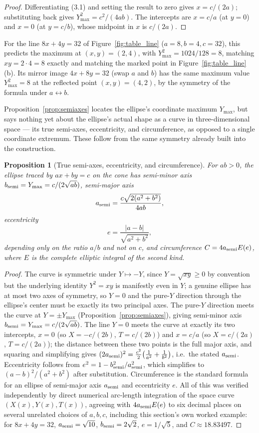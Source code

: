 \documentclass[11pt]{amsart}
\newtheorem{proposition}[theorem]{Proposition}
\theoremstyle{remark}
\begin{document}
\begin{proof}
Differentiating (3.1) and setting the result to zero gives $x=c/(2a)$; substituting back gives $Y^2_{\max}=c^2/(4ab)$. The intercepts are $x=c/a$ (at $y=0$) and $x=0$ (at $y=c/b$), whose midpoint in $x$ is $c/(2a)$.
\end{proof}

For the line $8x+4y=32$ of Figure~\ref{fig:table_line} ($a=8,b=4,c=32$), this predicts the maximum at $(x,y)=(2,4)$, with $Y^2_{\max}=1024/128=8$, matching $xy=2\cdot4=8$ exactly and matching the marked point in Figure~\ref{fig:table_line}(b). Its mirror image $4x+8y=32$ (swap $a$ and $b$) has the same maximum value $Y^2_{\max}=8$ at the reflected point $(x,y)=(4,2)$, by the symmetry of the formula under $a\leftrightarrow b$.

Proposition~\ref{prop:semiaxes} locates the ellipse's coordinate maximum $Y_{\max}$, but says nothing yet about the ellipse's actual shape as a curve in three-dimensional space --- its true semi-axes, eccentricity, and circumference, as opposed to a single coordinate extremum. These follow from the same symmetry already built into the construction.

\begin{proposition}[True semi-axes, eccentricity, and circumference]\label{prop:trueaxes}
For $ab>0$, the ellipse traced by $ax+by=c$ on the cone has semi-minor axis $b_{\rm semi}=Y_{\max}=c/(2\sqrt{ab})$, semi-major axis
\[
a_{\rm semi}=\frac{c\sqrt{2(a^2+b^2)}}{4ab},
\]
eccentricity
\[
e=\frac{|a-b|}{\sqrt{a^2+b^2}},
\]
depending only on the ratio $a/b$ and not on $c$, and circumference $C=4a_{\rm semi}E(e)$, where $E$ is the complete elliptic integral of the second kind.
\end{proposition}

\begin{proof}
The curve is symmetric under $Y\mapsto-Y$, since $Y=\sqrt{xy}\ge0$ by convention but the underlying identity $Y^2=xy$ is manifestly even in $Y$; a genuine ellipse has at most two axes of symmetry, so $Y=0$ and the pure-$Y$ direction through the ellipse's center must be exactly its two principal axes. The pure-$Y$ direction meets the curve at $Y=\pm Y_{\max}$ (Proposition~\ref{prop:semiaxes}), giving semi-minor axis $b_{\rm semi}=Y_{\max}=c/(2\sqrt{ab})$. The line $Y=0$ meets the curve at exactly its two intercepts, $x=0$ (so $X=-c/(2b)$, $T=c/(2b)$) and $x=c/a$ (so $X=c/(2a)$, $T=c/(2a)$); the distance between these two points is the full major axis, and squaring and simplifying gives $(2a_{\rm semi})^2=\tfrac{c^2}2\big(\tfrac1{a^2}+\tfrac1{b^2}\big)$, i.e.\ the stated $a_{\rm semi}$. Eccentricity follows from $e^2=1-b_{\rm semi}^2/a_{\rm semi}^2$, which simplifies to $(a-b)^2/(a^2+b^2)$ after substitution. Circumference is the standard formula for an ellipse of semi-major axis $a_{\rm semi}$ and eccentricity $e$. All of this was verified independently by direct numerical arc-length integration of the space curve $(X(x),Y(x),T(x))$, agreeing with $4a_{\rm semi}E(e)$ to six decimal places on several unrelated choices of $a,b,c$, including this section's own worked example: for $8x+4y=32$, $a_{\rm semi}=\sqrt{10}$, $b_{\rm semi}=2\sqrt2$, $e=1/\sqrt5$, and $C\approx18.83497$.
\end{proof}
\end{document}

